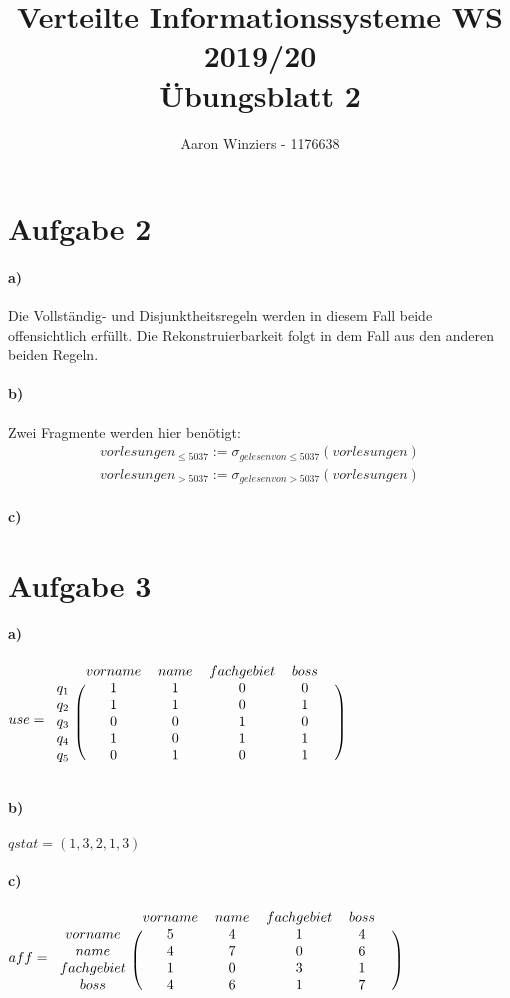 \documentclass[11pt,a4paper,parskip=half ]{scrartcl}
\author{Aaron Winziers - 1176638}
\title{Verteilte Informationssysteme WS 2019/20\\\LARGE{Übungsblatt 2}}
\begin{document}
	\maketitle
\section*{Aufgabe 2}
	\paragraph{a)} Die Vollständig- und Disjunktheitsregeln werden in diesem Fall beide offensichtlich erfüllt. Die Rekonstruierbarkeit folgt in dem Fall aus den anderen beiden Regeln.
	
	\paragraph{b)} Zwei Fragmente werden hier benötigt: 
	\begin{gather*}
		vorlesungen_{\leq5037} := \sigma_{gelesenvon\leq5037}(vorlesungen)	\\
		vorlesungen_{>5037} := \sigma_{gelesenvon>5037}(vorlesungen)
	\end{gather*}
	
	\paragraph{c)}

\section*{Aufgabe 3}
	\paragraph{a)}
	$ use =
	\begin{blockarray}{cccccc}
		 & vorname & name & fachgebiet & boss &  \\
		\begin{block}{c(ccccc)}
			q_{1} & 1 & 1 & 0 & 0 \\
			q_{2} & 1 & 1 & 0 & 1 \\
			q_{3} & 0 & 0 & 1 & 0 \\
			q_{4} & 1 & 0 & 1 & 1 \\
			q_{5} & 0 & 1 & 0 & 1 \\
		\end{block}
	\end{blockarray}
	$
	\paragraph{b)}$ qstat = (1,3,2,1,3)$
	
	\paragraph{c)}$ aff = 
	\begin{blockarray}{cccccc}
	& vorname & name & fachgebiet & boss &  \\
	\begin{block}{c(ccccc)}
	vorname 	& 5 & 4 & 1 & 4 \\
	name 		& 4 & 7 & 0 & 6 \\
	fachgebiet 	& 1 & 0 & 3 & 1 \\
	boss 		& 4 & 6 & 1 & 7 \\
	\end{block}
	\end{blockarray}
	$
	
\end{document}
